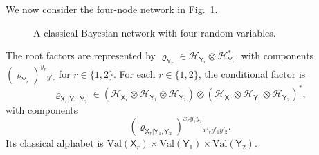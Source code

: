 \documentclass[
    aps,
    pra,
    reprint,
    superscriptaddress,
    nofootinbib
]{revtex4-2}
\theoremstyle{definition}
\theoremstyle{plain}
\begin{document}
We now consider the four-node network in Fig.~\ref{fig:qbn4}.
\begin{figure}[ht]
    \centering
    \caption{A classical Bayesian network with four random variables.}
    \label{fig:qbn4}
\end{figure}

The root factors are represented by
$\varrho_{\mathsf{Y}_{r}}
\in
\mathcal{H}_{\mathsf{Y}_{r}}
\otimes
\mathcal{H}_{\mathsf{Y}_{r}}^{*}$, with components
$(\varrho_{\mathsf{Y}_{r}})^{y_{r}}{}_{y'_{r}}$ for
$r\in\{1,2\}$. For each $r\in\{1,2\}$, the conditional factor is
\begin{equation*}
    \varrho_{\mathsf{X}_{r}|\mathsf{Y}_{1},\mathsf{Y}_{2}}
    \in{}
    (\mathcal{H}_{\mathsf{X}_{r}}
    \otimes\mathcal{H}_{\mathsf{Y}_{1}}
    \otimes\mathcal{H}_{\mathsf{Y}_{2}})
    \otimes
    (\mathcal{H}_{\mathsf{X}_{r}}
    \otimes\mathcal{H}_{\mathsf{Y}_{1}}
    \otimes\mathcal{H}_{\mathsf{Y}_{2}})^{*},
\end{equation*}
with components
\[
    (\varrho_{\mathsf{X}_{r}|\mathsf{Y}_{1},\mathsf{Y}_{2}})
    ^{x_{r}y_{1}y_{2}}{}_{x'_{r}y'_{1}y'_{2}}.
\]
Its classical alphabet is
$\mathrm{Val}(\mathsf{X}_{r})
\times\mathrm{Val}(\mathsf{Y}_{1})
\times\mathrm{Val}(\mathsf{Y}_{2})$.
\end{document}
